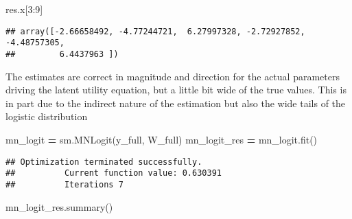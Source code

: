 \documentclass[
]{book}
\newenvironment{Shaded}{\begin{snugshade}}{\end{snugshade}}
\newcommand{\DecValTok}[1]{\textcolor[rgb]{0.00,0.00,0.81}{#1}}
\newcommand{\NormalTok}[1]{#1}
\newcommand{\OperatorTok}[1]{\textcolor[rgb]{0.81,0.36,0.00}{\textbf{#1}}}
\theoremstyle{definition}
\theoremstyle{definition}
\theoremstyle{definition}
\theoremstyle{remark}
\begin{document}
\begin{Shaded}
\begin{Highlighting}[]
\NormalTok{res.x[}\DecValTok{3}\NormalTok{:}\DecValTok{9}\NormalTok{]}
\end{Highlighting}
\end{Shaded}

\begin{verbatim}
## array([-2.66658492, -4.77244721,  6.27997328, -2.72927852, -4.48757305,
##         6.4437963 ])
\end{verbatim}

The estimates are correct in magnitude and direction for the actual parameters driving the latent utility equation, but a little bit wide of the true values. This is in part due to the indirect nature of the estimation but also the wide tails of the logistic distribution

\begin{Shaded}
\begin{Highlighting}[]
\NormalTok{mn\_logit }\OperatorTok{=}\NormalTok{ sm.MNLogit(y\_full, W\_full)}
\NormalTok{mn\_logit\_res }\OperatorTok{=}\NormalTok{ mn\_logit.fit()}
\end{Highlighting}
\end{Shaded}

\begin{verbatim}
## Optimization terminated successfully.
##          Current function value: 0.630391
##          Iterations 7
\end{verbatim}

\begin{Shaded}
\begin{Highlighting}[]
\NormalTok{mn\_logit\_res.summary()}
\end{Highlighting}
\end{Shaded}
\end{document}
